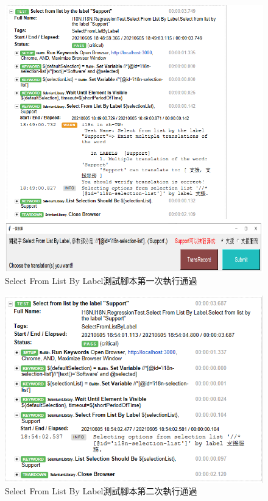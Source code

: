 \begin{figure}[H]
\centering
\includegraphics[width= .8\textwidth]{../論文截圖/4.1.4-2 select from list by label 1st run.png}
\caption{Select From List By Label測試腳本第一次執行通過}
\end{figure}

\begin{figure}[H]
\centering
\includegraphics[width= .8\textwidth]{../論文截圖/4.1.4-3 select from list by label 2nd run.png}
\caption{Select From List By Label測試腳本第二次執行通過}
\end{figure}

\hspace*{\fill} \\
\\ \hspace*{\fill} \\
\\ \hspace*{\fill} \\
\\ \hspace*{\fill} \\
\\ \hspace*{\fill} \\
